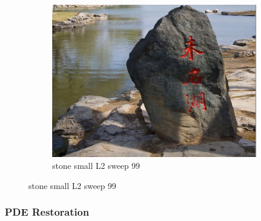 \documentclass[11pt]{article}
\begin{document}
\begin{figure}[ht!]
\begin{subfigure}[]{0.333\linewidth}
        \centering
        \includegraphics[width=\linewidth]{fig/restoration/stone_small/L2/gibbs_99.jpg}
        \caption{stone small L2 sweep 99}
    \end{subfigure}%
\end{figure}

\subsubsection{PDE Restoration}
\end{document}
